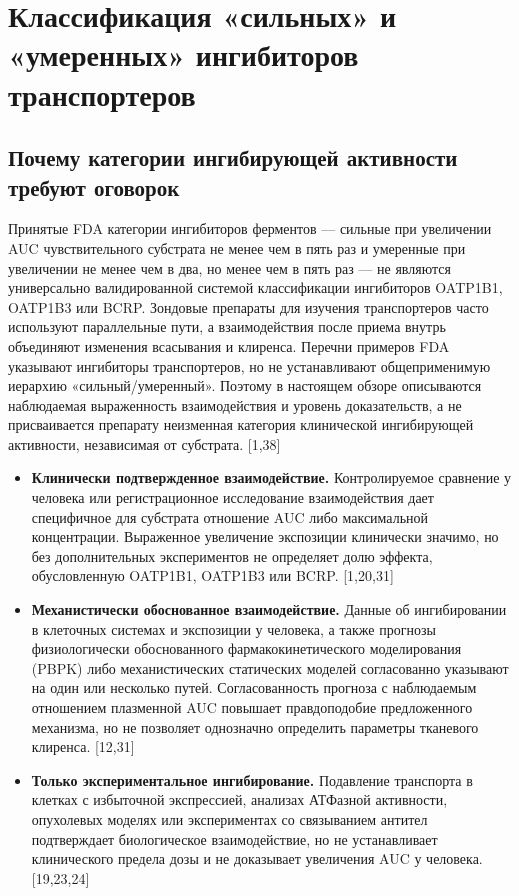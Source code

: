 \documentclass[11pt]{article}
\begin{document}
\section{Классификация «сильных» и «умеренных» ингибиторов транспортеров}

\subsection{Почему категории ингибирующей активности требуют оговорок}

Принятые FDA категории ингибиторов ферментов --- сильные при увеличении AUC чувствительного субстрата не менее чем в пять раз и умеренные при увеличении не менее чем в два, но менее чем в пять раз --- не являются универсально валидированной системой классификации ингибиторов OATP1B1, OATP1B3 или BCRP. Зондовые препараты для изучения транспортеров часто используют параллельные пути, а взаимодействия после приема внутрь объединяют изменения всасывания и клиренса. Перечни примеров FDA указывают ингибиторы транспортеров, но не устанавливают общеприменимую иерархию «сильный/умеренный». Поэтому в настоящем обзоре описываются наблюдаемая выраженность взаимодействия и уровень доказательств, а не присваивается препарату неизменная категория клинической ингибирующей активности, независимая от субстрата. [1,38]

\begin{itemize}
\item \textbf{Клинически подтвержденное взаимодействие.} Контролируемое сравнение у человека или регистрационное исследование взаимодействия дает специфичное для субстрата отношение AUC либо максимальной концентрации. Выраженное увеличение экспозиции клинически значимо, но без дополнительных экспериментов не определяет долю эффекта, обусловленную OATP1B1, OATP1B3 или BCRP. [1,20,31]
\item \textbf{Механистически обоснованное взаимодействие.} Данные об ингибировании в клеточных системах и экспозиции у человека, а также прогнозы физиологически обоснованного фармакокинетического моделирования (PBPK) либо механистических статических моделей согласованно указывают на один или несколько путей. Согласованность прогноза с наблюдаемым отношением плазменной AUC повышает правдоподобие предложенного механизма, но не позволяет однозначно определить параметры тканевого клиренса. [12,31]
\item \textbf{Только экспериментальное ингибирование.} Подавление транспорта в клетках с избыточной экспрессией, анализах АТФазной активности, опухолевых моделях или экспериментах со связыванием антител подтверждает биологическое взаимодействие, но не устанавливает клинического предела дозы и не доказывает увеличения AUC у человека. [19,23,24]
\end{itemize}
\end{document}
